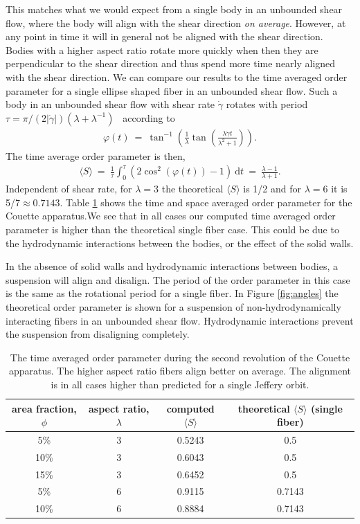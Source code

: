 \documentclass[preprint, 10pt]{elsarticle}
\begin{document}
This matches what we would expect from a single body in an unbounded
shear flow, where the body will align with the shear direction \emph{on
average}. However, at any point in time it will in general not be
aligned with the shear direction. Bodies with a higher aspect ratio
rotate more quickly when then they are perpendicular to the shear
direction and thus spend more time nearly aligned with the shear
direction. We can compare our results to the time averaged order
parameter for a single ellipse shaped fiber in an unbounded shear flow.
Such a body in an unbounded shear flow with shear rate $\dot{\gamma}$
rotates with period $\tau = \pi/(2| \dot{\gamma}|)(\lambda +
\lambda^{-1})$~\cite{Jeffery1922} according to 
\begin{align*}
  \varphi(t) ~=~ \tan^{-1}\left(\frac{1}{\lambda}\tan\left(
    \frac{\lambda \dot{\gamma}t}{\lambda^2 + 1}\right)\right).
\end{align*}
The time average order parameter is then,
\begin{align*}
  \langle S\rangle ~=~ \frac{1}{\tau}\int_0^\tau\left( 
    2\cos^2(\varphi(t)) - 1\right)~\text{d}t ~=~ \frac{\lambda -1}{\lambda+1}.
\end{align*}
Independent of shear rate, for $\lambda= 3$ the theoretical $\langle S\rangle$ is 1/2 and for $\lambda=6$ it is  5/7$\approx
0.7143$. Table
\ref{tab:order} shows the time and space averaged order parameter for
the Couette apparatus.We see that in all
cases our computed time averaged order parameter is higher than the
theoretical single fiber case. This could be due to the hydrodynamic
interactions between the bodies, or the effect of the solid walls.

In the absence of solid walls and hydrodynamic interactions between
bodies, a suspension will align and disalign. The period of the order
parameter in this case is the same as the rotational period for a single
fiber. In Figure \ref{fig:angles} the theoretical order parameter is
shown for a suspension of non-hydrodynamically interacting fibers in an
unbounded shear flow.  Hydrodynamic interactions prevent the suspension
from disaligning completely.



\begin{table}[!h]
\begin{center}
\begin{tabular}{c |c |c |c}
area fraction, $\phi$ & aspect ratio, $\lambda$ & computed $ \langle S \rangle$ & theoretical
$\langle S \rangle$ (single fiber)\\
\hline
5\% &3& 0.5243 & 0.5\\
10\% &3 & 0.6043 & 0.5\\
15\% & 3 & 0.6452 & 0.5\\
5\% & 6 & 0.9115 & 0.7143\\
10\% & 6 & 0.8884 & 0.7143
\end{tabular}
\end{center}
\caption{The time averaged order parameter during the second revolution of the Couette apparatus. The higher aspect ratio fibers align better on average. The alignment is in all cases higher than predicted for a single Jeffery orbit.
}\label{tab:order}
\end{table} 
\end{document}
